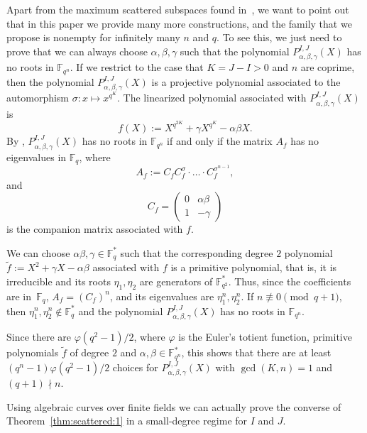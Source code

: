 \begin{rema}\label{rem:no_roots}
Apart from the maximum scattered subspaces found in~\cite{BMN2022}, we want to point out that in this paper we provide many more constructions, and the family that we propose is nonempty for infinitely many $n$ and $q$. To see this, we just need to prove that we can always choose $\alpha, \beta,\gamma$ such that the polynomial $P^{I,J}_{\alpha,\beta,\gamma}(X)$ has no roots in ${\mathbb F}_{q^n}$. If we restrict to the case that $K=J-I>0$ and $n$ are coprime, then the polynomial $P^{I,J}_{\alpha,\beta,\gamma}(X)$ is a projective polynomial associated to the automorphism $\sigma\colon x\longmapsto x^{q^K}$. The  linearized polynomial associated with $P^{I,J}_{\alpha,\beta,\gamma}(X)$ is $$f(X):=X^{q^{2K}} + \gamma X^{q^K} - \alpha\beta X.$$
By \cite[Theorem 6]{mcguire2019characterization}, $P^{I,J}_{\alpha,\beta,\gamma}(X)$ has no roots in ${\mathbb F}_{q^n}$ if and only if the matrix $A_f$ has no eigenvalues in $\mathbb{F}_q$, where
$$A_f:=C_f C_f^\sigma\cdot\ldots\cdot C_f^{\sigma^{n-1}},$$
and 
$$C_f=\begin{pmatrix}
0 & \alpha\beta  \\
1& -\gamma
\end{pmatrix}$$
is the companion matrix associated with $f$. 

We can choose $\alpha\beta,\gamma \in \mathbb{F}_q^*$ such that the corresponding degree $2$ polynomial \mbox{$\tilde{f}:=X^2+\gamma X-\alpha\beta$} associated with $f$ is a primitive polynomial, that is, it is irreducible and its roots $\eta_1,\eta_2$ are generators of $\mathbb{F}_{q^2}^*$. Thus, since the coefficients are in~$\mathbb{F}_q$,  $A_f=(C_f)^n$, and its eigenvalues are $\eta_1^n,\eta_2^n$. If $n \not\equiv 0 \pmod{q+1}$, then $\eta_1^n,\eta_2^n\notin \mathbb{F}_q^*$ and the polynomial $P^{I,J}_{\alpha,\beta,\gamma}(X)$ has no roots in ${\mathbb F}_{q^n}$. 

Since there are $\varphi(q^2-1)/2$, where $\varphi$ is the Euler's totient function, primitive polynomials $\tilde{f}$ of degree $2$ and $\alpha,\beta\in \mathbb{F}_{q^n}^*$, this shows that there are at least \mbox{$(q^n-1)\varphi(q^2-1)/2$} choices for $P^{I,J}_{\alpha,\beta,\gamma}(X)$ with $\gcd(K,n)=1$ and $(q+1)\nmid n$.
\end{rema}

Using algebraic curves  over finite fields we can actually prove the converse of Theorem~\ref{thm:scattered:1} in a small-degree regime for $I$ and $J$. 

